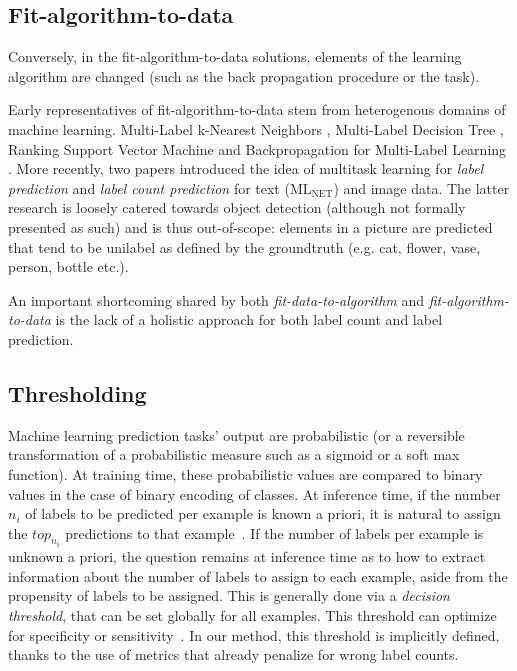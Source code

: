 \subsection{Fit-algorithm-to-data}
Conversely, in the fit-algorithm-to-data solutions, elements of the learning
algorithm are changed (such as the back propagation procedure or the task).

Early representatives of fit-algorithm-to-data stem from heterogenous domains
of machine learning. Multi-Label k-Nearest Neighbors \cite{ML-KNN},
Multi-Label Decision Tree \cite{ML-DT}, Ranking Support Vector Machine
\cite{multilabelSVM} and Backpropagation for Multi-Label Learning
\cite{multilabelBackprop}. More recently, two papers introduced the idea of
multitask learning for \emph{label prediction} and \emph{label count
prediction} for text (ML\(_{\text{NET}}\)) \cite{multitaskLabel} and image
\cite{multitaskLabelImages, tencent} data. The latter research is loosely
catered towards object detection (although not formally presented as such) and
is thus out-of-scope: elements in a picture are predicted that tend to be
unilabel as defined by the groundtruth (e.g. cat, flower, vase, person, bottle
etc.).

An important shortcoming shared by both \emph{fit-data-to-algorithm} and
\emph{fit-algorithm-to-data} is the lack of a holistic approach for both label
count and label prediction.

\subsection{Thresholding}
\label{subsec:thresh}

Machine learning prediction tasks' output are probabilistic (or a reversible
transformation of a probabilistic measure such as a sigmoid or a soft max
function). At training time, these probabilistic values are compared to binary
values in the case of binary encoding of classes. At inference time, if the
number $n_i$ of labels to be predicted per example is known a priori, it is
natural to assign the $top_{n_i}$ predictions to that
example~\cite{lossTopKError, topKmulticlassSVM}. If the number of labels per
example is unknown a priori, the question remains at inference time as to how
to extract information about the number of labels to assign to each example,
aside from the propensity of labels to be assigned. This is generally done via
a \emph{decision threshold}, that can be set globally for all examples. This
threshold can optimize for specificity or
sensitivity~\cite{decisionThreshold}. In our method, this threshold is
implicitly defined, thanks to the use of metrics that already penalize for
wrong label counts.

